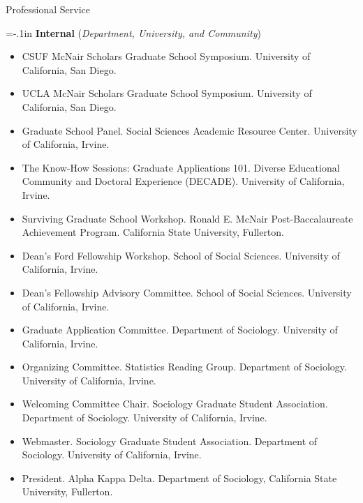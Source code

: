 \documentclass{resume} %
\newenvironment{hangt}[1]
 {\par\vspace{-\parsep}%
  \begin{itemize}[label={#1\ \quad},leftmargin=*,labelsep=0pt]
  \raggedright
  \item\relax
  \vspace*{8pt}
  }
 {\end{itemize}}
\newcommand{\datefill}{\quad \hspace{12pt}}
\begin{document}
\begin{rSection}{Professional Service}
\vspace{1em}



{\parindent=-.1in \bf Internal} (\textit{Department, University, and Community})

\begin{hangt}{2018 \datefill}
CSUF McNair Scholars Graduate School Symposium. University of California, San Diego.
\end{hangt}
\begin{hangt}{2018 \datefill}
UCLA McNair Scholars Graduate School Symposium. University of California, San Diego.
\end{hangt}
\begin{hangt}{2018 \datefill}
Graduate School Panel. Social Sciences Academic Resource Center. University of California, Irvine.
\end{hangt}
\begin{hangt}{2016 \datefill}
The Know-How Sessions: Graduate Applications 101. Diverse Educational Community and Doctoral Experience (DECADE). University of California, Irvine.
\end{hangt}
\begin{hangt}{2015 \datefill}
Surviving Graduate School Workshop. Ronald E. McNair Post-Baccalaureate Achievement Program. California State University, Fullerton.
\end{hangt}
\begin{hangt}{2014--2016}
Dean's Ford Fellowship Workshop. School of Social Sciences. University of California, Irvine.
\end{hangt}
\begin{hangt}{2014--2019}
Dean's Fellowship Advisory Committee. School of Social Sciences. University of California, Irvine.
\end{hangt}
\begin{hangt}{2014--2016}
Graduate Application Committee. Department of Sociology. University of California, Irvine.
\end{hangt}
\begin{hangt}{2013--2014}
Organizing Committee. Statistics Reading Group. Department of Sociology. University of California, Irvine.
\end{hangt}
\begin{hangt}{2013 \datefill}
Welcoming Committee Chair. Sociology Graduate Student Association. Department of Sociology. University of California, Irvine.
\end{hangt}
\begin{hangt}{2012--2019}
Webmaster. Sociology Graduate Student Association. Department of Sociology. University of California, Irvine.
\end{hangt}
\begin{hangt}{2009--2010}
President. Alpha Kappa Delta. Department of Sociology, California State University, Fullerton.
\end{hangt}

\end{rSection}
\end{document}
